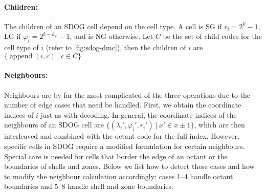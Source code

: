 \paragraph{Children:}
The children of an SDOG cell depend on the cell type.
A cell is SG if $r_i = 2^k - 1$, LG if $\varphi_i = 2^{k - k_\varphi} - 1$, and is NG otherwise.
Let $C$ be the set of child codes for the cell type of $i$ (refer to \cref{fig:sdog-dmc}), then the children of $i$ are $\{ \operatorname{append}(i, c) \ | \ c \in C \}$


\paragraph{Neighbours:}
Neighbours are by far the most complicated of the three operations due to the number of edge cases that need be handled.
First, we obtain the coordinate indices of $i$ just as with decoding.
In general, the coordinate indices of the neighbours of an SDOG cell are $\{ (\lambda_i', \varphi_i', r_i') \ | \ x' \in x \pm 1 \}$, which are then interleaved and combined with the octant code for the full index.
However, specific cells in SDOG require a modified formulation for certain neighbours.
Special care is needed for cells that border the edge of an octant or the boundaries of shells and zones.
Below we list how to detect these cases and how to modify the neighbour calculation accordingly; cases 1--4 handle octant boundaries and 5--8 handle shell and zone boundaries.
%
